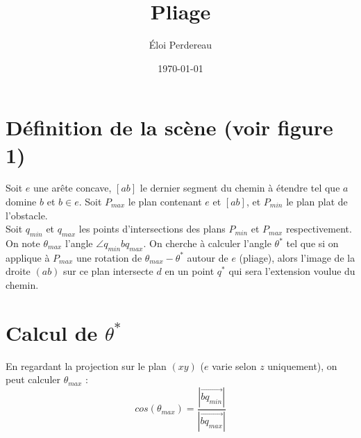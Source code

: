 \documentclass{article}
\title{Pliage}
\author{\'Eloi Perdereau}
\date{\today}
\begin{document}
\maketitle

\section{Définition de la scène (voir figure 1)}
Soit $e$ une arête concave, $[ab]$ le dernier segment du chemin à étendre tel que $a$ domine $b$ et $b \in e$. Soit $P_{max}$ le plan contenant $e$ et $[ab]$, et $P_{min}$ le plan plat de l'obstacle.\\
Soit $q_{min}$ et $q_{max}$ les points d'intersections des plans $P_{min}$ et $P_{max}$ respectivement. On note $\theta_{max}$ l'angle $\angle{q_{min} b q_{max}}$.
On cherche à calculer l'angle $\theta^*$ tel que si on applique à $P_{max}$ une rotation de $\theta_{max}-\theta^*$ autour de $e$ (pliage), alors l'image de la droite $(ab)$ sur ce plan intersecte $d$ en un point $q^*$ qui sera l'extension voulue du chemin. \\

\section{Calcul de $\theta^*$}
En regardant la projection sur le plan $(xy)$ ($e$ varie selon $z$ uniquement), on peut calculer $\theta_{max}$ :
\[cos(\theta_{max}) = \frac{|\vec{bq_{min}}|}{|\vec{bq_{max}}|}\]
\end{document}
